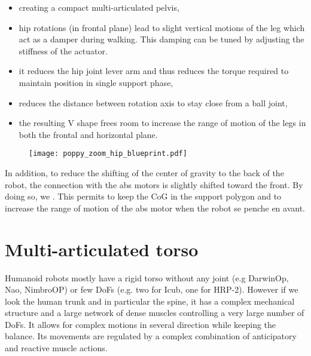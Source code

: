 \begin{itemize}
    \item creating a compact multi-articulated pelvis,
    \item hip rotations (in frontal plane) lead to slight vertical motions of the leg which act as a damper during walking. This damping can be tuned by adjusting the stiffness of the actuator.
    \item it reduces the hip joint lever arm and thus reduces the torque required to maintain position in single support phase,
    \item reduces the distance between rotation axis to stay close from a ball joint,
    \item the resulting V shape frees room to increase the range of motion of the legs in both the frontal and horizontal plane.
\end{itemize}

\begin{figure}[p]
    \begin{center}
        \texttt{[image: poppy\_zoom\_hip\_blueprint.pdf]}
    \end{center}
    \caption{}
    \label{fig:poppy_zoom_hip_blueprint}
\end{figure}

In addition, to reduce the shifting of the center of gravity to the back of the robot, the connection with the abs motors is slightly shifted toward the front. By doing so, we .
This permits to keep the CoG in the support polygon and to increase the range of motion of the abs motor when the robot se penche en avant.


\section{Multi-articulated torso} %

Humanoid robots mostly have a rigid torso without any joint (e.g DarwinOp, Nao, NimbroOP) or few DoFs (e.g. two for Icub, one for HRP-2). However if we look the human trunk and in particular the spine, it has a complex mechanical structure and a large network of dense muscles controlling a very large number of DoFs. It allows for complex motions in several direction while keeping the balance. Its movements are regulated by a complex combination of anticipatory and reactive muscle actions.

